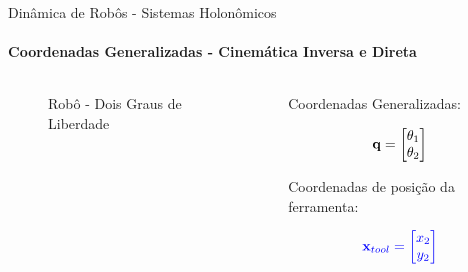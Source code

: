 \documentclass[aspectratio=169]{beamer}
\begin{document}
\begin{frame}{Dinâmica de Robôs - Sistemas Holonômicos}
    \framesubtitle{Coordenadas Generalizadas - Cinemática Inversa e Direta}


    \begin{columns}
        \begin{column}[c]{0.6\textwidth}
            \begin{figure}[!ht]
                
                \caption{Robô - Dois Graus de Liberdade\footnotemark}
            \end{figure}
        \end{column}
        \begin{column}[c]{0.4\textwidth}
            
            Coordenadas Generalizadas:

            $$
            \color{black}{
                \mathbf{q} = 
                \begin{bmatrix}
                \theta_1 \\
                \theta_2    
                \end{bmatrix}
            }
            $$

            Coordenadas de posição da ferramenta: 

            $$
            \color{blue}{
                \mathbf{x}_{tool} = 
                \begin{bmatrix}
                x_2 \\
                y_2    
                \end{bmatrix}
            }
            $$
        \end{column}
    \end{columns}
\end{frame}
\end{document}
